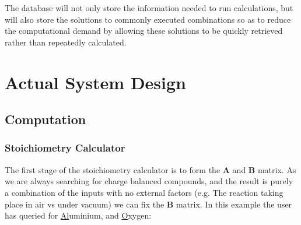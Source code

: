 The database will not only store the information needed to run calculations, but will also store the solutions to commonly executed combinations so as to reduce the computational demand by allowing these solutions to be quickly retrieved rather than repeatedly calculated.

\section{Actual System Design}
\subsection{Computation}
\label{section:computation}
\subsubsection{Stoichiometry Calculator}
The first stage of the stoichiometry calculator is to form the $\mathbf{A}$ and $\mathbf{B}$ matrix. As we are always searching for charge balanced compounds, and the result is purely a combination of the inputs with no external factors (e.g. The reaction taking place in air vs under vacuum) we can fix the $\mathbf{B}$ matrix. In this example the user has queried for \underline{Al}uminium, and \underline{O}xygen:

